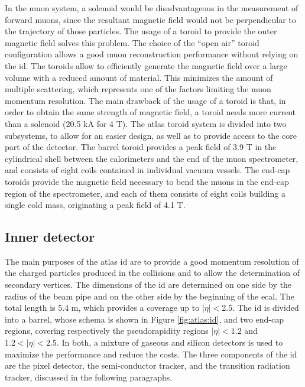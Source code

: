 In the muon system, a solenoid would be disadvantageous in the measurement of forward muons, since the resultant magnetic field would not be perpendicular to the trajectory of those particles. The usage of a toroid to provide the outer magnetic field solves this problem. 
The choice of the “open air” toroid configuration allows a good muon
reconstruction performance without relying on the \gls{id}. 
The toroids allow to efficiently generate the magnetic field over a large volume with a reduced amount
of material. This minimizes the amount of multiple scattering, which represents one
of the factors limiting the muon momentum resolution.
The main drawback of the usage of a toroid is that, in order to obtain the same strength of magnetic field, a toroid needs more current than a solenoid (20.5 kA for 4 T).
The \gls{atlas} toroid system is divided into two subsystems, to allow for an easier design, 
as well as to provide access to the core part of the detector.
The barrel toroid \cite{ATLAS:1997ac} provides a peak field of 3.9 T in the cylindrical shell between the calorimeters and the end of the muon spectrometer, and consists of eight coils contained in individual vacuum vessels.  
The end-cap toroids \cite{ATLAS:1997ab} provide the magnetic field necessary to bend the muons in the end-cap region of the spectrometer, and each of them consists of eight coils building a single cold mass, originating a peak field of 4.1 T. 



\subsection{Inner detector}
\label{sec:atlas:id}

The main purposes of the \gls{atlas} \gls{id} \cite{ATLAS:1997ag,ATLAS:1997af} are to provide a good momentum resolution of the charged particles produced in the collisions and to allow the determination of secondary vertices. The dimensions of the \gls{id} are determined on one side by the 
radius of the beam pipe and on the other side by the beginning of the \gls{ecal}. The total length is 5.4 m, which provides a coverage up to $|\eta|<$2.5.
The \gls{id} is divided into a barrel, whose schema is shown in Figure \ref{fig:atlas:id}, and two end-cap regions, covering respectively the pseudorapidity regions $|\eta|<1.2$ and $1.2<|\eta|<2.5$. In both, a mixture of gaseous and silicon detectors is used to maximize the performance and reduce the costs. The three components of the \gls{id} are the pixel detector, the semi-conductor tracker, and the transition radiation tracker, discussed in the following paragraphs.

